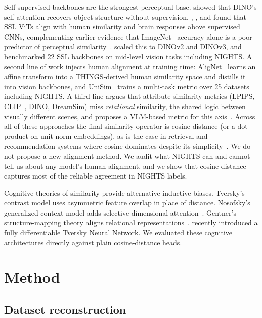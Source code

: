 \documentclass{article}
\begin{document}
Self-supervised backbones are the strongest perceptual base. \citet{caron2021dino} showed that DINO's self-attention recovers object structure without supervision. \citet{muttenthaler2022vice}, \citet{muttenthaler2022human}, and \citet{conwell2024large} found that SSL ViTs align with human similarity and brain responses above supervised CNNs, complementing earlier evidence that ImageNet~\citep{deng2009imagenet} accuracy alone is a poor predictor of perceptual similarity~\citep{kumar2022perceptual}. \citet{oquab2023dinov2} scaled this to DINOv2 and DINOv3, and \citet{chen2025midlevel} benchmarked 22 SSL backbones on mid-level vision tasks including NIGHTS. A second line of work injects human alignment at training time: AligNet~\citep{muttenthaler2025alignet} learns an affine transform into a THINGS-derived human similarity space and distills it into vision backbones, and UniSim~\citep{ghazanfari2025unisim} trains a multi-task metric over 25 datasets including NIGHTS. A third line argues that attribute-similarity metrics (LPIPS, CLIP~\citep{radford2021clip}, DINO, DreamSim) miss \emph{relational} similarity, the shared logic between visually different scenes, and proposes a VLM-based metric for this axis~\citep{le2025relsim}. Across all of these approaches the final similarity operator is cosine distance (or a dot product on unit-norm embeddings), as is the case in retrieval and recommendation systems where cosine dominates despite its simplicity~\citep{steck2024cosine,you2025semantics}. We do not propose a new alignment method. We audit what NIGHTS can and cannot tell us about any model's human alignment, and we show that cosine distance captures most of the reliable agreement in NIGHTS labels.

Cognitive theories of similarity provide alternative inductive biases. Tversky's~\citep{tversky1977} contrast model uses asymmetric feature overlap in place of distance. Nosofsky's generalized context model adds selective dimensional attention~\citep{nosofsky1986}. Gentner's structure-mapping theory aligns relational representations~\citep{gentner1983}. \citet{doumbouya2025tversky} recently introduced a fully differentiable Tversky Neural Network. We evaluated these cognitive architectures directly against plain cosine-distance heads.

\section{Method}

\subsection{Dataset reconstruction}
\end{document}
